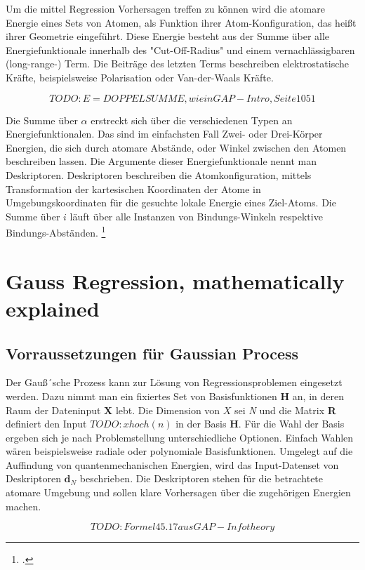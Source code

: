Um die mittel Regression Vorhersagen treffen zu können wird die atomare Energie eines Sets von Atomen, als Funktion ihrer Atom-Konfiguration, das heißt ihrer Geometrie eingeführt. Diese Energie besteht aus der Summe über alle Energiefunktionale innerhalb des  "Cut-Off-Radius" und einem vernachlässigbaren (long-range-) Term. Die Beiträge des letzten Terms beschreiben elektrostatische Kräfte, beispielsweise Polarisation oder Van-der-Waals Kräfte. 

$$TODO: E=DOPPELSUMME, wie in GAP-Intro, Seite 1051$$

Die Summe über $\alpha$ erstreckt sich über die verschiedenen Typen an Energiefunktionalen. Das sind im einfachsten Fall Zwei- oder Drei-Körper Energien, die sich durch atomare Abstände, oder Winkel zwischen den Atomen beschreiben lassen. Die Argumente dieser Energiefunktionale nennt man Deskriptoren. Deskriptoren beschreiben die Atomkonfiguration, mittels Transformation der kartesischen Koordinaten der Atome in Umgebungskoordinaten für die gesuchte lokale Energie eines Ziel-Atoms. Die Summe über $i$ läuft über alle Instanzen von Bindungs-Winkeln respektive Bindungs-Abständen. \footcite[1051]{GAP-intro}


\section{Gauss Regression, mathematically explained}

\subsection{Vorraussetzungen für Gaussian Process}

Der Gauß´sche Prozess kann zur Lösung von Regressionsproblemen eingesetzt werden. Dazu nimmt man ein fixiertes Set von Basisfunktionen \textbf{H} an, in deren Raum der Dateninput \textbf{X} lebt. Die Dimension von $X$ sei \textit{N} und die Matrix \textbf{R} definiert den Input $TODO:x hoch (n)$ in der Basis \textbf{H}. Für die Wahl der Basis ergeben sich je nach Problemstellung unterschiedliche Optionen. Einfach Wahlen wären beispielsweise radiale oder polynomiale Basisfunktionen. Umgelegt auf die Auffindung von quantenmechanischen Energien, wird das Input-Datenset von Deskriptoren $\textbf{d}_N$ beschrieben. Die Deskriptoren stehen für die betrachtete atomare Umgebung und sollen klare Vorhersagen über die zugehörigen Energien machen. 

$$TODO: Formel 45.17 aus GAP-Info theory$$

